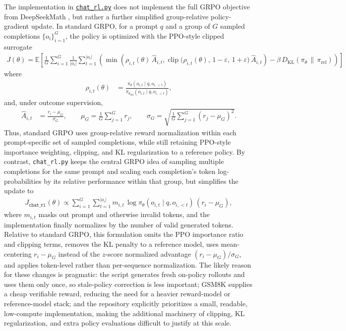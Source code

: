 \documentclass[a4paper,12pt]{article}
\begin{document}
The implementation in \href{https://github.com/karpathy/nanochat/blob/master/scripts/chat_rl.py}{\texttt{chat\_rl.py}} does not implement the full GRPO objective from DeepSeekMath \cite{deepseekmath}, but rather a further simplified group-relative policy-gradient update. In standard GRPO, for a prompt \(q\) and a group of \(G\) sampled completions \(\{o_i\}_{i=1}^G\), the policy is optimized with the PPO-style clipped surrogate
{\small\begin{align*}
J(\theta)
=
\mathbb{E}
\left[
\frac{1}{G}\sum_{i=1}^G \frac{1}{|o_i|}\sum_{t=1}^{|o_i|}
\left(
\min\!\left(
\rho_{i,t}(\theta)\,\hat{A}_{i,t},
\operatorname{clip}\!\bigl(\rho_{i,t}(\theta),\,1-\varepsilon,\,1+\varepsilon\bigr)\,\hat{A}_{i,t}
\right)
-
\beta\,D_{\mathrm{KL}}\!\left(\pi_\theta \,\|\, \pi_{\mathrm{ref}}\right)
\right)
\right]
\end{align*}}%
where
\begin{align*}
\rho_{i,t}(\theta)
&=
\frac{
\pi_\theta(o_{i,t}\mid q,o_{i,<t})
}{
\pi_{\theta_{\mathrm{old}}}(o_{i,t}\mid q,o_{i,<t})
},
\end{align*}
and, under outcome supervision,
\begin{align*}
\hat{A}_{i,t}
&=
\frac{r_i-\mu_G}{\sigma_G},
\qquad
\mu_G=\frac{1}{G}\sum_{j=1}^G r_j,
\qquad
\sigma_G=
\sqrt{\frac{1}{G}\sum_{j=1}^G (r_j-\mu_G)^2}.
\end{align*}
Thus, standard GRPO uses group-relative reward normalization within each prompt-specific set of sampled completions, while still retaining PPO-style importance weighting, clipping, and KL regularization to a reference policy. By contrast, \texttt{chat\_rl.py} keeps the central GRPO idea of sampling multiple completions for the same prompt and scaling each completion's token log-probabilities by its relative performance within that group, but simplifies the update to
\begin{align*}
J_{\texttt{chat\_rl}}(\theta)
\propto
\sum_{i=1}^G \sum_{t=1}^{|o_i|}
m_{i,t}\,\log \pi_\theta(o_{i,t}\mid q,o_{i,<t})\,(r_i-\mu_G),
\end{align*}
where \(m_{i,t}\) masks out prompt and otherwise invalid tokens, and the implementation finally normalizes by the number of valid generated tokens. Relative to standard GRPO, this formulation omits the PPO importance ratio and clipping terms, removes the KL penalty to a reference model, uses mean-centering \(r_i-\mu_G\) instead of the \(z\)-score normalized advantage \((r_i-\mu_G)/\sigma_G\), and applies token-level rather than per-sequence normalization. The likely reason for these changes is pragmatic: the script generates fresh on-policy rollouts and uses them only once, so stale-policy correction is less important; GSM8K supplies a cheap verifiable reward, reducing the need for a heavier reward-model or reference-model stack; and the repository explicitly prioritizes a small, readable, low-compute implementation, making the additional machinery of clipping, KL regularization, and extra policy evaluations difficult to justify at this scale.
\end{document}
